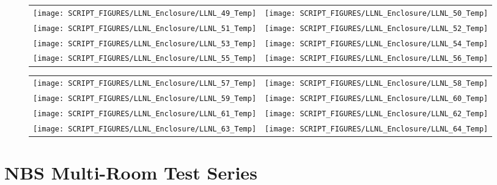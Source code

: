 \begin{figure}[p]
\begin{tabular*}{\textwidth}{l@{\extracolsep{\fill}}r}
\texttt{[image: SCRIPT\_FIGURES/LLNL\_Enclosure/LLNL\_49\_Temp]} &
\texttt{[image: SCRIPT\_FIGURES/LLNL\_Enclosure/LLNL\_50\_Temp]} \\
\texttt{[image: SCRIPT\_FIGURES/LLNL\_Enclosure/LLNL\_51\_Temp]} &
\texttt{[image: SCRIPT\_FIGURES/LLNL\_Enclosure/LLNL\_52\_Temp]} \\
\texttt{[image: SCRIPT\_FIGURES/LLNL\_Enclosure/LLNL\_53\_Temp]} &
\texttt{[image: SCRIPT\_FIGURES/LLNL\_Enclosure/LLNL\_54\_Temp]} \\
\texttt{[image: SCRIPT\_FIGURES/LLNL\_Enclosure/LLNL\_55\_Temp]} &
\texttt{[image: SCRIPT\_FIGURES/LLNL\_Enclosure/LLNL\_56\_Temp]}
\end{tabular*}
\label{LLNL_Enclosure_Temp_7}
\end{figure}

\begin{figure}[p]
\begin{tabular*}{\textwidth}{l@{\extracolsep{\fill}}r}
\texttt{[image: SCRIPT\_FIGURES/LLNL\_Enclosure/LLNL\_57\_Temp]} &
\texttt{[image: SCRIPT\_FIGURES/LLNL\_Enclosure/LLNL\_58\_Temp]} \\
\texttt{[image: SCRIPT\_FIGURES/LLNL\_Enclosure/LLNL\_59\_Temp]} &
\texttt{[image: SCRIPT\_FIGURES/LLNL\_Enclosure/LLNL\_60\_Temp]} \\
\texttt{[image: SCRIPT\_FIGURES/LLNL\_Enclosure/LLNL\_61\_Temp]} &
\texttt{[image: SCRIPT\_FIGURES/LLNL\_Enclosure/LLNL\_62\_Temp]} \\
\texttt{[image: SCRIPT\_FIGURES/LLNL\_Enclosure/LLNL\_63\_Temp]} &
\texttt{[image: SCRIPT\_FIGURES/LLNL\_Enclosure/LLNL\_64\_Temp]}
\end{tabular*}
\label{LLNL_Enclosure_Temp_8}
\end{figure}

\clearpage


\section{NBS Multi-Room Test Series}

